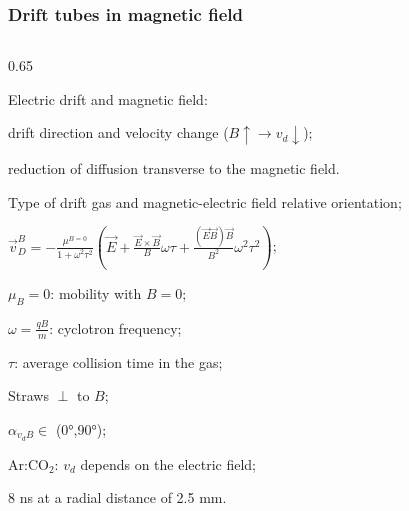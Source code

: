 \documentclass{beamer}
\begin{document}
\begin{frame}
    \frametitle{Drift tubes in magnetic field}

    \vspace{-3mm}
    \begin{columns}
        \begin{column}{0.65\framewidth}
            \setlength{\leftmargini}{1.1em}
            \begin{itemize}
               {\small \item Electric drift and magnetic field: }
               \begin{itemize}
                {\small       \item drift direction and velocity change ($ B \uparrow \rightarrow v_d \downarrow$); 
                \item reduction of diffusion transverse to the magnetic field. 
                } 
            \end{itemize}
            \vspace{1mm}
                {\small \item Type of drift gas 
                and magnetic-electric field relative orientation;}
                \vspace{1mm}
               {\footnotesize \item    $     \vec{v}_D^B=-\frac{\mu^{B=0}}{1+\omega^2 \tau^2}\left(\vec{E}+\frac{\vec{E} \times \vec{B}}{B} \omega \tau+\frac{(\vec{E} \vec{B}) \vec{B}}{B^2} \omega^2 \tau^2\right)$;}
               \vspace{1mm}
               {\small  \item $\mu_B = 0$: mobility with $B=0$;
               \vspace{1mm}
                \item $\omega = \frac{qB}{m}$: cyclotron frequency; 
                \vspace{1mm}
                \item $\tau$: average collision time in the gas;
                \vspace{1mm}
                \item Straws $\perp$ to $B$;
                \vspace{1mm}
                \item $\alpha_{v_d B} \in$ (0°,90°);
                \vspace{1mm}
                \item Ar:CO$_2$: $v_{d}$ depends on the electric field;
                \vspace{1mm}
                \item 8 ns at a radial distance of 2.5 mm.}


\end{itemize}
\end{column}
\end{columns}
\end{frame}
\end{document}
